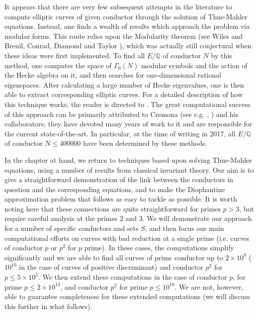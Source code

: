It appears that there are very few subsequent attempts in the literature to compute elliptic curves of given 
conductor through the solution of Thue-Mahler equations. Instead, one finds a wealth of 
results which approach the problem via modular forms. This route relies upon the Modularity theorem (see Wiles 
\cite{Wi} and Breuil, Conrad, Diamond and Taylor \cite{BCDT}), which was actually still conjectural 
when these ideas were first implemented. To find all $E/\mathbb{Q}$ of conductor $N$ by this method, one computes the 
space of $\Gamma_0(N)$ modular symbols and the action of the Hecke algebra on it, and then searches for one-dimensional 
rational eigenspaces. After calculating a large number of Hecke eigenvalues, one is then able to extract corresponding 
elliptic curves. For a detailed description of how this technique works, the reader is directed to  \cite{Cre2}. The 
great computational success of this approach can be primarily attributed to Cremona (see e.g. \cite{Cre1}, \cite{Cre2}) 
and his collaborators; they have devoted many years of work to it and are responsible for the current state-of-the-art. 
In particular, at the time of writing in 2017, all $E/\mathbb{Q}$ of conductor $N \leq 400000$ have been determined by these methods.

In the chapter at hand, we return to techniques based upon solving Thue-Mahler equations, using a 
number of results from classical invariant theory. Our aim is to give a straightforward demonstration of the link 
between the conductors in question and the corresponding equations, and to make the Diophantine approximation problem 
that follows as easy to tackle as possible. It is worth noting here that these connections are quite straightforward for primes $p > 3$, but require 
careful analysis at the primes $2$ and $3$. We will demonstrate our approach for a number of specific conductors and sets $S$, and then focus 
our main computational efforts on curves with bad reduction at a single prime (i.e. curves of conductor $p$ or $p^2$ for 
$p$ prime).  In these cases, the computations simplify significantly and we 
are able to find all curves of prime conductor up to $2 \times 10^9$ ($10^{10}$ in the case of curves of positive 
discriminant) and conductor $p^2$ for $p \leq 5\times 10^5$. We then extend these computations in the case of conductor 
$p$,  for prime $p \leq 2 \times 10^{13}$, and conductor $p^2$ for prime $p \leq 10^{10}$. We are not, however, able to 
guarantee completeness for these extended computations (we will discuss this further in what follows). 

